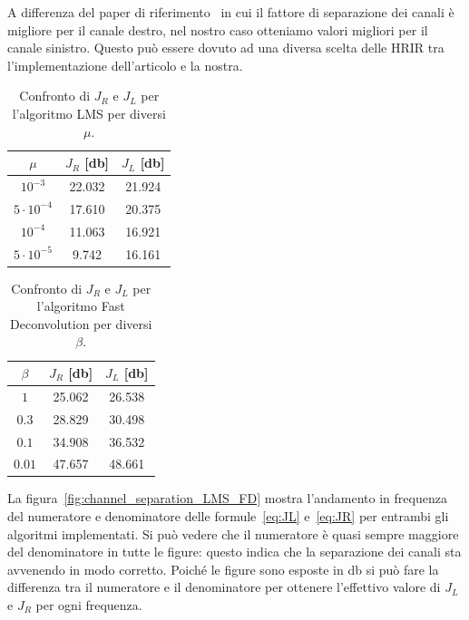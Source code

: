 \documentclass[12pt,a4paper,titlepage]{article}
\begin{document}
A differenza del paper di riferimento~\cite{Li:comprehensive_comparison} in cui il fattore di separazione dei canali è migliore per il canale destro, nel nostro caso otteniamo valori migliori per il canale sinistro. Questo può essere dovuto ad una diversa scelta delle HRIR tra l'implementazione dell'articolo e la nostra.

\begin{table}[h]
\centering
\begin{tabular}{c c c}
\toprule
$\mu$   & $J_R$ [\si{\decibel}]   & $J_L$ [\si{\decibel}]   \\ \midrule
$10^{-3}$ & 22.032 & 21.924 \\
$5\cdot10^{-4}$ & 17.610 & 20.375 \\
$10^{-4}$& 11.063 & 16.921 \\
$5\cdot10^{-5}$ & 9.742  & 16.161 \\ \bottomrule
\end{tabular}
\caption{\label{tab:LMS_result}Confronto di $J_R$ e $J_L$ per l'algoritmo LMS per diversi $\mu$.}
\end{table}

\begin{table}[h]
\centering
\begin{tabular}{c c c}
\toprule
$\beta$   & $J_R$ [\si{\decibel}]   & $J_L$ [\si{\decibel}]   \\ \midrule
$1$ &  25.062 &  26.538\\
$0.3$ &  28.829 &  30.498\\
$0.1$&  34.908 & 36.532 \\
$0.01$ &  47.657 &  48.661 \\ \bottomrule
\end{tabular}
\caption{\label{tab:FD_result}Confronto di $J_R$ e $J_L$ per l'algoritmo Fast Deconvolution per diversi $\beta$.}
\end{table}

La figura~\ref{fig:channel_separation_LMS_FD} mostra l'andamento in frequenza del numeratore e denominatore delle formule~\eqref{eq:JL} e~\eqref{eq:JR} per entrambi gli algoritmi implementati. Si può vedere che il numeratore è quasi sempre maggiore del denominatore in tutte le figure: questo indica che la separazione dei canali sta avvenendo in modo corretto. Poiché le figure sono esposte in \si{\decibel} si può fare la differenza tra il numeratore e il denominatore per ottenere l'effettivo valore di $J_L$ e $J_R$ per ogni frequenza.
\end{document}

